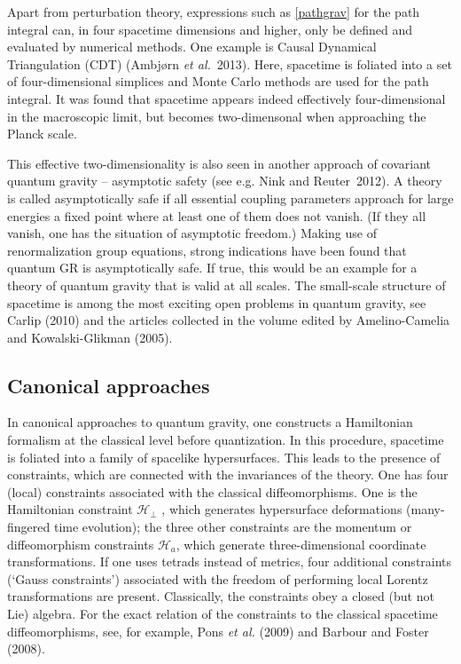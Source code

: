 \documentclass[12pt]{article}
\begin{document}
Apart from perturbation theory, expressions such as \eqref{pathgrav}
for the path integral can, in four spacetime dimensions and higher, only be 
defined and evaluated by numerical methods. One example is Causal
Dynamical Triangulation (CDT) (Ambj\o rn {\em et al.}~2013). Here, spacetime
is foliated into a set of four-dimensional simplices
and Monte Carlo methods are used for the path integral. It was found
that spacetime appears indeed effectively four-dimensional in the
macroscopic limit, but becomes two-dimensonal when approaching the
Planck scale.

This effective two-dimensionality is also seen in another approach of
covariant quantum gravity -- asymptotic safety (see e.g. Nink and
Reuter~2012). A theory is called asymptotically safe if all essential
coupling parameters approach for large energies a fixed point where at
least one of them does not vanish. (If they all vanish, one has the
situation of asymptotic freedom.) Making use of renormalization group
equations, strong indications have been found that quantum GR is
asymptotically safe. If true, this would be an example for a theory of
quantum gravity that is valid at all scales.
The small-scale structure of spacetime is among the most exciting open
problems in quantum gravity, see Carlip (2010) and the articles
collected in the volume edited by Amelino-Camelia and
Kowalski-Glikman (2005).  

\subsection{Canonical approaches}


In canonical approaches to quantum gravity, one constructs a
Hamiltonian formalism at the classical level before quantization. 
In this procedure, spacetime is foliated into a family of spacelike
hypersurfaces. This
leads to the presence of constraints, which are connected with the
invariances of the theory. One has four (local) constraints associated
with the classical diffeomorphisms.  One is the
Hamiltonian constraint ${\mathcal H}_{\perp}$ , which generates
hypersurface deformations 
(many-fingered time evolution); the three other constraints are the momentum or
diffeomorphism constraints ${\mathcal H}_a$, 
which generate three-dimensional coordinate transformations. 
If one uses tetrads instead of
metrics, four additional constraints (`Gauss constraints') associated
with the freedom of performing local Lorentz transformations are
present. Classically, the constraints obey a closed (but not Lie) algebra. 
For the exact relation of the constraints to the classical spacetime
diffeomorphisms, see, for example, Pons {\em et al.} (2009) and
Barbour and Foster (2008).
\end{document}
